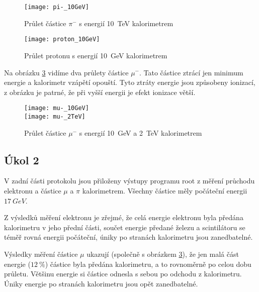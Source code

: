 \documentclass{protokol}
\begin{document}
    \vspace{-10pt}

    \begin{figure}[H]
      \centering
      \texttt{[image: pi-\_10GeV]}
      \vspace{-10pt}
      \caption{Průlet částice $\pi^-$ s energií \SI{10}{TeV} kalorimetrem}
      \label{fig:pi-_10GeV}
    \end{figure}

    \vspace{-10pt}

    \begin{figure}[H]
      \centering
      \texttt{[image: proton\_10GeV]}
      \vspace{-10pt}
      \caption{Průlet protonu s energií \SI{10}{GeV} kalorimetrem} 
      \label{fig:proton_10GeV}
    \end{figure}

    \vspace{-10pt}

    Na obrázku \ref{fig:mu-} vidíme dva průlety částice $\mu^-$. Tato částice ztrácí jen minimum energie a kalorimetr vzápětí opouští. Tyto ztráty energie jsou způsobeny ionizací, z obrázku je patrné, že při vyšší energii je efekt ionizace větší.

    \begin{figure}[H]
      \centering
      \texttt{[image: mu-\_10GeV]}\\
      \texttt{[image: mu-\_2TeV]}
      \vspace{-10pt}
      \caption{Průlet částice $\mu^-$ s energií \SI{10}{GeV} a \SI{2}{TeV} kalorimetrem}
      \label{fig:mu-}
    \end{figure}

  \subsection*{Úkol 2}

    V zadní části protokolu jsou přiloženy výstupy programu root z měření průchodu elektronu a částice $\mu$ a $\pi$ kalorimetrem. Všechny částice měly počáteční energii $\SI{17}{GeV}$.

    Z výsledků měření elektronu je zřejmé, že celá energie elektronu byla předána kalorimetru v jeho přední části, součet energie předané železu a scintilátoru se téměř rovná energii počáteční, úniky po stranách kalorimetru jsou zanedbatelné.

    Výsledky měření částice $\mu$ ukazují (společně s obrázkem \ref{fig:mu-}), že jen malá část energie ($\SI{12}{\percent}$) částice byla předána kalorimetru, a to rovnoměrně po celou dobu průletu. Většinu energie si částice odnesla s sebou po odchodu z kalorimetru. Úniky energie po stranách kalorimetru jsou opět zanedbatelné.
\end{document}
